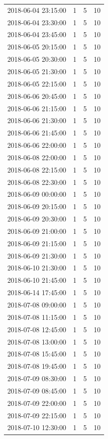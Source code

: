 \begin{tabular}{lrrr}
2018-06-04 23:15:00 & 1 & 5 & 10 \\
2018-06-04 23:30:00 & 1 & 5 & 10 \\
2018-06-04 23:45:00 & 1 & 5 & 10 \\
2018-06-05 20:15:00 & 1 & 5 & 10 \\
2018-06-05 20:30:00 & 1 & 5 & 10 \\
2018-06-05 21:30:00 & 1 & 5 & 10 \\
2018-06-05 22:15:00 & 1 & 5 & 10 \\
2018-06-06 20:45:00 & 1 & 5 & 10 \\
2018-06-06 21:15:00 & 1 & 5 & 10 \\
2018-06-06 21:30:00 & 1 & 5 & 10 \\
2018-06-06 21:45:00 & 1 & 5 & 10 \\
2018-06-06 22:00:00 & 1 & 5 & 10 \\
2018-06-08 22:00:00 & 1 & 5 & 10 \\
2018-06-08 22:15:00 & 1 & 5 & 10 \\
2018-06-08 22:30:00 & 1 & 5 & 10 \\
2018-06-09 00:00:00 & 1 & 5 & 10 \\
2018-06-09 20:15:00 & 1 & 5 & 10 \\
2018-06-09 20:30:00 & 1 & 5 & 10 \\
2018-06-09 21:00:00 & 1 & 5 & 10 \\
2018-06-09 21:15:00 & 1 & 5 & 10 \\
2018-06-09 21:30:00 & 1 & 5 & 10 \\
2018-06-10 21:30:00 & 1 & 5 & 10 \\
2018-06-10 21:45:00 & 1 & 5 & 10 \\
2018-06-14 17:45:00 & 1 & 5 & 10 \\
2018-07-08 09:00:00 & 1 & 5 & 10 \\
2018-07-08 11:15:00 & 1 & 5 & 10 \\
2018-07-08 12:45:00 & 1 & 5 & 10 \\
2018-07-08 13:00:00 & 1 & 5 & 10 \\
2018-07-08 15:45:00 & 1 & 5 & 10 \\
2018-07-08 19:45:00 & 1 & 5 & 10 \\
2018-07-09 08:30:00 & 1 & 5 & 10 \\
2018-07-09 08:45:00 & 1 & 5 & 10 \\
2018-07-09 22:00:00 & 1 & 5 & 10 \\
2018-07-09 22:15:00 & 1 & 5 & 10 \\
2018-07-10 12:30:00 & 1 & 5 & 10 \\

\end{tabular}
